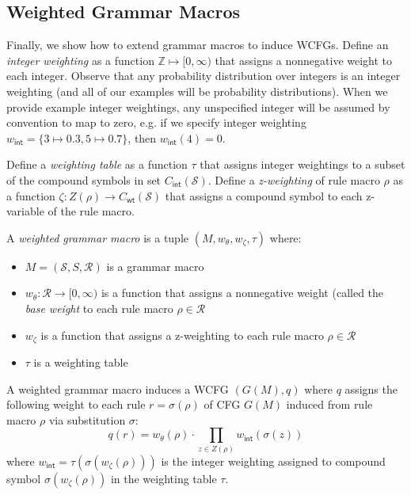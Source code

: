 \documentclass[11pt]{article}
\begin{document}
\subsection{Weighted Grammar Macros}

Finally, we show how to extend grammar macros to induce WCFGs. Define an \emph{integer weighting} as a function $\mathbb{Z} \mapsto [0,\infty)$ that assigns a nonnegative weight to each integer. Observe that any probability distribution over integers is an integer weighting (and all of our examples will be probability distributions). When we provide example integer weightings, any unspecified integer will be assumed by convention to map to zero, e.g. if we specify integer weighting $w_\mathsf{int} = \{3 \mapsto 0.3, 5 \mapsto 0.7\}$, then $w_\mathsf{int}(4) = 0$.

Define a \emph{weighting table} as a function $\tau$ that assigns integer weightings to a subset of the compound symbols in set $C_{\mathsf{int}}(\mathcal{S})$. Define a \emph{z-weighting} of rule macro $\rho$ as a function $\zeta: Z(\rho) \rightarrow C_{\mathsf{wt}}(\mathcal{S})$ that assigns a compound symbol to each z-variable of the rule macro.

A \emph{weighted grammar macro} is a tuple $(M, w_\theta, w_\zeta, \tau)$ where:
\begin{itemize}
	\item $M = (\mathcal{S}, S, \mathcal{R})$ is a grammar macro
	\item $w_\theta: \mathcal{R} \rightarrow [0,\infty)$ is a function that assigns a nonnegative weight (called the \emph{base weight} to each rule macro $\rho \in \mathcal{R}$
	\item $w_\zeta$ is a function that assigns a z-weighting to each rule macro $\rho \in \mathcal{R}$
	\item $\tau$ is a weighting table
\end{itemize}

\noindent A weighted grammar macro induces a WCFG $(G(M), q)$ where $q$ assigns the following weight to each rule $r = \sigma(\rho)$ of CFG $G(M)$ induced from rule macro $\rho$ via substitution $\sigma$:
\begin{equation*}
	q(r) = w_\theta(\rho) \cdot \prod\limits_{z \in Z(\rho)} w_\mathsf{int}(\sigma(z))
\end{equation*}
\noindent where $w_\mathsf{int} = \tau(\sigma(w_\zeta(\rho)))$ is the integer weighting assigned to compound symbol $\sigma(w_\zeta(\rho))$ in the weighting table $\tau$.
\end{document}
